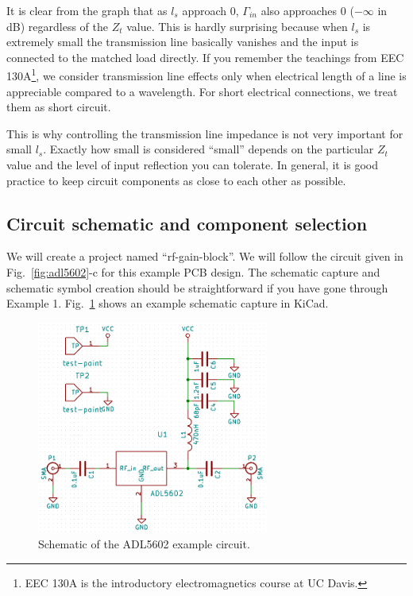 \documentclass[12pt,letterpaper]{scrartcl}
\begin{document}

It is clear from the graph that as $l_s$ approach 0, $\Gamma_{in}$ also approaches 0 ($-\infty$ in dB) regardless of the $Z_t$ value. This is hardly surprising because when $l_s$ is extremely small the transmission line basically vanishes and the input is connected to the matched load directly. If you remember the teachings from EEC 130A\footnote{EEC 130A is the introductory electromagnetics course at UC Davis.}, we consider transmission line effects only when electrical length of a line is appreciable compared to a wavelength. For short electrical connections, we treat them as short circuit. 

This is why controlling the transmission line impedance is not very important for small $l_s$. Exactly how small is considered ``small'' depends on the particular $Z_t$ value and the level of input reflection you can tolerate. In general, it is good practice to keep circuit components as close to each other as possible. 

\subsection{Circuit schematic and component selection}
We will create a project named ``rf-gain-block''. We will follow the circuit given in Fig.~\ref{fig:adl5602}-c for this example PCB design. The schematic capture and schematic symbol creation should be straightforward if you have gone through Example 1. Fig.~\ref{fig:example2-schematic} shows an example schematic capture in KiCad. 

\begin{figure}[hp]
	\centering
	\includegraphics[width=3in]{example2-schematic}
	\caption{Schematic of the ADL5602 example circuit. }
	\label{fig:example2-schematic}
\end{figure}
\end{document}
